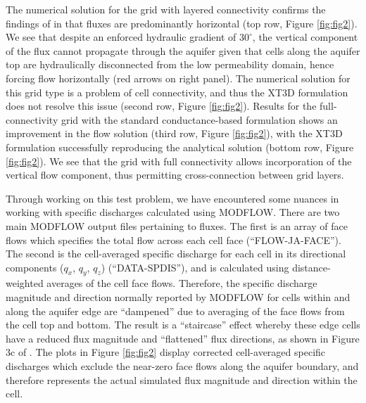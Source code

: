 \documentclass{article}
\begin{document}
The numerical solution for the grid with layered connectivity confirms the findings of \cite{bardot2022} in that fluxes are predominantly horizontal (top row, Figure \ref{fig:fig2}). We see that despite an enforced hydraulic gradient of $30^{\circ}$, the vertical component of the flux cannot propagate through the aquifer given that cells along the aquifer top are hydraulically disconnected from the low permeability domain, hence forcing flow horizontally (red arrows on right panel). The numerical solution for this grid type is a problem of cell connectivity, and thus the XT3D formulation does not resolve this issue (second row, Figure \ref{fig:fig2}). Results for the full-connectivity grid with the standard conductance-based formulation shows an improvement in the flow solution (third row, Figure \ref{fig:fig2}), with the XT3D formulation successfully reproducing the analytical solution (bottom row, Figure \ref{fig:fig2}). We see that the grid with full connectivity allows incorporation of the vertical flow component, thus permitting cross-connection between grid layers.

Through working on this test problem, we have encountered some nuances in working with specific discharges calculated using MODFLOW. There are two main MODFLOW output files pertaining to fluxes. The first is an array of face flows which specifies the total flow across each cell face (``FLOW-JA-FACE''). The second is the cell-averaged specific discharge for each cell in its directional components ($q_{x}$, $q_{y}$, $q_{z}$) (``DATA-SPDIS''), and is calculated using distance-weighted averages of the cell face flows. Therefore, the specific discharge magnitude and direction normally reported by MODFLOW for cells within and along the aquifer edge are ``dampened'' due to averaging of the face flows from the cell top and bottom. The result is a ``staircase'' effect whereby these edge cells have a reduced flux magnitude and ``flattened'' flux directions, as shown in Figure 3c of \cite{bardot2022}. The plots in Figure \ref{fig:fig2} display corrected cell-averaged specific discharges which exclude the near-zero face flows along the aquifer boundary, and therefore represents the actual simulated flux magnitude and direction within the cell. 

\end{document}
